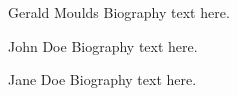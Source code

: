 \documentclass[12pt,journal,compsoc]{IEEEtran}
\begin{document}
\begin{IEEEbiography}{Gerald Moulds}
Biography text here.
\end{IEEEbiography}

\begin{IEEEbiographynophoto}{John Doe}
Biography text here.
\end{IEEEbiographynophoto}


\begin{IEEEbiographynophoto}{Jane Doe}
Biography text here.
\end{IEEEbiographynophoto}



\end{document}
